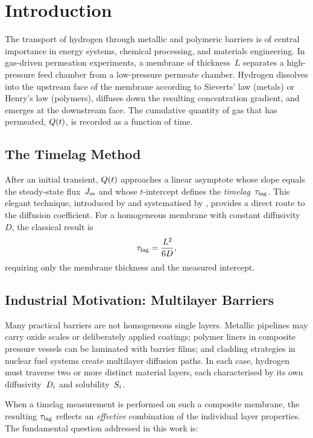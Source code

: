 \section{Introduction}
\label{sec:introduction}

The transport of hydrogen through metallic and polymeric barriers is of central
importance in energy systems, chemical processing, and materials engineering.
In gas-driven permeation experiments, a membrane of thickness~$L$ separates a
high-pressure feed chamber from a low-pressure permeate chamber.  Hydrogen
dissolves into the upstream face of the membrane according to Sieverts' law
(metals) or Henry's law (polymers), diffuses down the resulting concentration
gradient, and emerges at the downstream face.  The cumulative quantity of gas
that has permeated, $Q(t)$, is recorded as a function of time.

\subsection{The Timelag Method}

After an initial transient, $Q(t)$ approaches a linear asymptote whose slope
equals the steady-state flux~$J_{\mathrm{ss}}$ and whose $t$-intercept defines the
\emph{timelag}~$\tau_{\mathrm{lag}}$.  This elegant technique, introduced by
\textcite{Daynes1920} and systematised by \textcite{Barrer1951}, provides a
direct route to the diffusion coefficient.  For a homogeneous membrane with
constant diffusivity~$D$, the classical result is
\begin{equation}
  \label{eq:classical-timelag}
  \tau_{\mathrm{lag}} = \frac{L^{2}}{6D},
\end{equation}
requiring only the membrane thickness and the measured intercept.

\subsection{Industrial Motivation: Multilayer Barriers}

Many practical barriers are not homogeneous single layers.  Metallic pipelines
may carry oxide scales or deliberately applied coatings; polymer liners in
composite pressure vessels can be laminated with barrier films; and cladding
strategies in nuclear fuel systems create multilayer diffusion paths.  In each
case, hydrogen must traverse two or more distinct material layers, each
characterised by its own diffusivity~$D_{i}$ and solubility~$S_{i}$.

When a timelag measurement is performed on such a composite membrane, the
resulting $\tau_{\mathrm{lag}}$ reflects an \emph{effective} combination of the individual
layer properties.  The fundamental question addressed in this work is:


